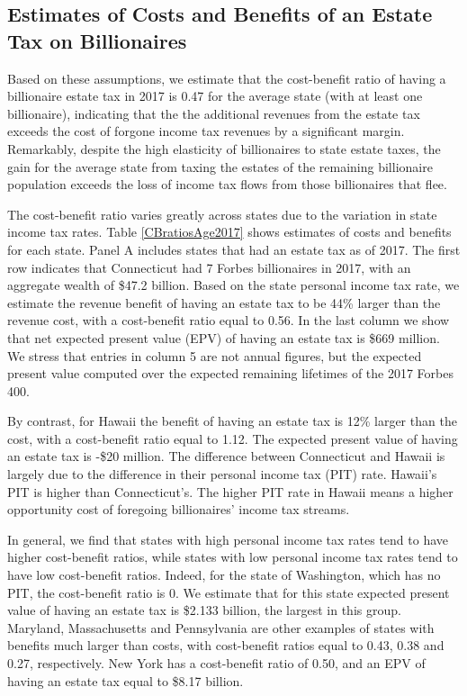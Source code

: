 \documentclass[12pt]{article}
\begin{document}

\subsection{Estimates of Costs and Benefits of an Estate Tax on Billionaires} 

Based on these assumptions, we estimate that the cost-benefit ratio of having a billionaire estate tax in 2017 is 0.47 for the average state (with at least one billionaire), indicating that the the additional revenues from the estate tax exceeds the cost of forgone income tax revenues by a significant margin. Remarkably, despite the high elasticity of billionaires to state estate taxes, the gain  for the average state from taxing the estates of the remaining billionaire population exceeds the loss of income tax flows from those billionaires that flee. 

The cost-benefit ratio varies greatly across states due to the variation in state income tax rates.   
Table \ref{CBratiosAge2017} shows estimates of costs and benefits for each state. Panel A includes states that had an estate tax as of 2017. The first row indicates that Connecticut had 7 Forbes billionaires in 2017, with an aggregate wealth of  \$47.2 billion. Based on the state personal income tax rate, we estimate the revenue benefit of having an estate tax to be 44\% larger than the revenue cost, with a cost-benefit ratio equal to 0.56. In the last column we show that net expected present value (EPV) of having an estate tax is \$669 million. We stress that entries in column 5 are not annual figures, but the expected present value computed over the expected remaining lifetimes of the 2017 Forbes 400. 

By contrast, for Hawaii the benefit of having an estate tax is 12\% larger than the cost, with a cost-benefit ratio equal to 1.12.  The expected present value of having an estate tax is -\$20 million. 
The difference between Connecticut and Hawaii is largely due to the difference in their personal income tax (PIT) rate. Hawaii's PIT is higher than Connecticut's.  The higher PIT rate in Hawaii means a higher opportunity cost of foregoing billionaires' income tax streams. 

In general, we find that states with high personal income tax rates tend to have higher cost-benefit ratios, while states with low personal income tax rates  tend to have low cost-benefit ratios. Indeed, for the state of Washington, which has no PIT, the cost-benefit ratio is 0. We estimate that for this state expected present value of having an estate tax is \$2.133 billion, the largest in this group. Maryland, Massachusetts and Pennsylvania are other examples of states with benefits much larger than costs, with cost-benefit ratios equal to 0.43, 0.38 and 0.27, respectively. New York has a cost-benefit ratio of 0.50, and an EPV of having an estate tax equal to \$8.17 billion.
\end{document}
